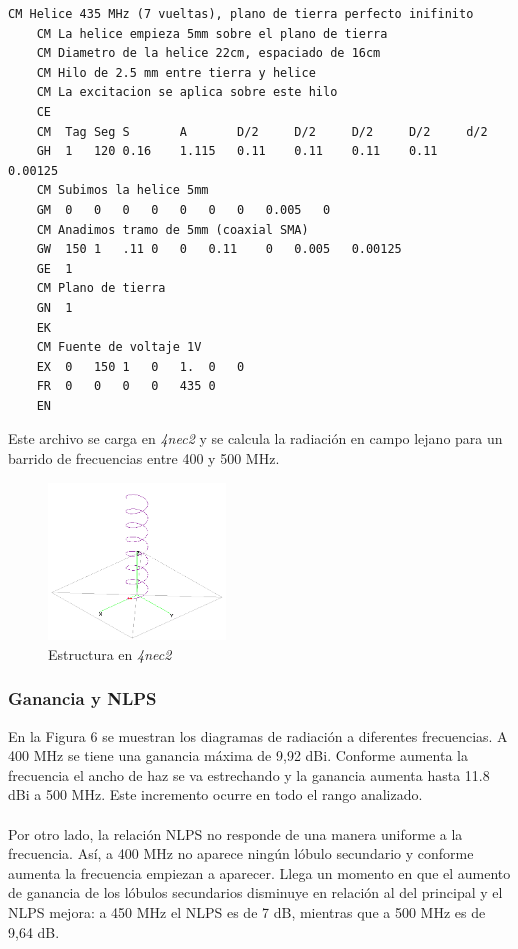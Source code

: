 \documentclass[12pt]{article}
\begin{document}
\begin{lstlisting}[caption={Archivo .nec con la confifuración de la estructura},captionpos=b]
	CM Helice 435 MHz (7 vueltas), plano de tierra perfecto inifinito
	CM La helice empieza 5mm sobre el plano de tierra
	CM Diametro de la helice 22cm, espaciado de 16cm
	CM Hilo de 2.5 mm entre tierra y helice
	CM La excitacion se aplica sobre este hilo
	CE
	CM	Tag	Seg	S		A		D/2		D/2		D/2		D/2		d/2
	GH	1	120	0.16	1.115	0.11	0.11	0.11	0.11	0.00125
	CM Subimos la helice 5mm
	GM	0	0	0	0	0	0	0	0.005	0
	CM Anadimos tramo de 5mm (coaxial SMA)
	GW	150	1	.11	0	0	0.11	0	0.005	0.00125
	GE	1
	CM Plano de tierra
	GN	1
	EK
	CM Fuente de voltaje 1V
	EX	0	150	1	0	1.	0	0
	FR	0	0	0	0	435	0
	EN
\end{lstlisting}

Este archivo se carga en \textit{4nec2} y se calcula la radiación en campo lejano para un barrido de frecuencias entre 400 y 500 MHz.\\

\begin{figure}[!h]
	\centering
	\includegraphics[width=0.42\textwidth]{helix_1.png}
	\caption{Estructura en \textit{4nec2}}
	\label{fig:estructura}
\end{figure}

\subsubsection*{Ganancia y NLPS}

En la Figura 6 se muestran los diagramas de radiación a diferentes frecuencias. A 400 MHz se tiene una ganancia máxima de 9,92 dBi. Conforme aumenta la frecuencia el ancho de haz se va estrechando y la ganancia aumenta hasta 11.8 dBi a 500 MHz. Este incremento ocurre en todo el rango analizado.\\\\
Por otro lado, la relación NLPS no responde de una manera uniforme a la frecuencia. Así, a 400 MHz no aparece ningún lóbulo secundario y conforme aumenta la frecuencia empiezan a aparecer. Llega un momento en que el aumento de ganancia de los lóbulos secundarios disminuye en relación al del principal y el NLPS mejora: a 450 MHz el NLPS es de 7 dB, mientras que a 500 MHz es de 9,64 dB.\\
\end{document}
